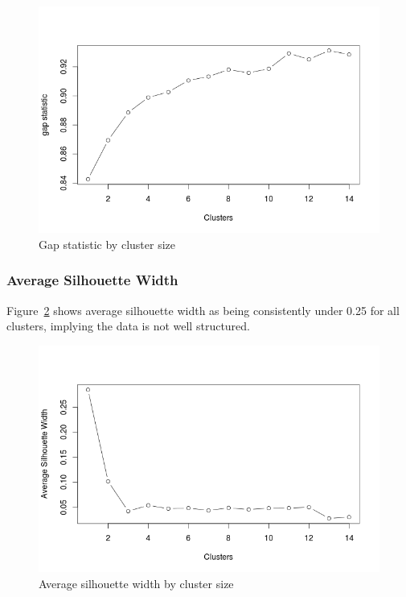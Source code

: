 \documentclass[letterpaper,12pt]{article}
\begin{document}
\begin{figure}[h]
  \centering
  \includegraphics[width=\linewidth]{gap-statistic.png}
  \caption{Gap statistic by cluster size}
  \label{fig:gap-statistic}
\end{figure}

\subsubsection{Average Silhouette Width}

Figure~\ref{fig:asw} shows average silhouette width as being consistently under
0.25 for all clusters, implying the data is not well structured.

\begin{figure}[h]
  \centering
  \includegraphics[width=\linewidth]{asw.png}
  \caption{Average silhouette width by cluster size}
  \label{fig:asw}
\end{figure}
\end{document}
